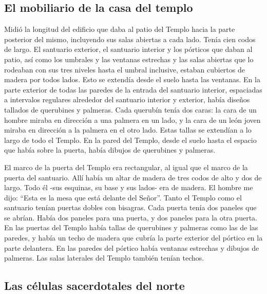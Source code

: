 \hypertarget{el-mobiliario-de-la-casa-del-templo}{%
\subsection{El mobiliario de la casa del
templo}\label{el-mobiliario-de-la-casa-del-templo}}

 Midió la longitud del edificio que daba al patio del
Templo hacia la parte posterior del mismo, incluyendo sus salas abiertas
a cada lado. Tenía cien codos de largo. El santuario exterior, el
santuario interior y los pórticos que daban al patio, 
así como los umbrales y las ventanas estrechas y las salas abiertas que
lo rodeaban con sus tres niveles hasta el umbral inclusive, estaban
cubiertos de madera por todos lados. Esto se extendía desde el suelo
hasta las ventanas.  En la parte exterior de todas las
paredes de la entrada del santuario interior, espaciadas a intervalos
regulares alrededor del santuario interior y exterior, 
había diseños tallados de querubines y palmeras. Cada querubín tenía dos
caras:  la cara de un hombre miraba en dirección a una
palmera en un lado, y la cara de un león joven miraba en dirección a la
palmera en el otro lado. Estas tallas se extendían a lo largo de todo el
Templo.  En la pared del Templo, desde el suelo hasta el
espacio que había sobre la puerta, había dibujos de querubines y
palmeras.

 El marco de la puerta del Templo era rectangular, al
igual que el marco de la puerta del santuario.  Allí
había un altar de madera de tres codos de alto y dos de largo. Todo él
-sus esquinas, su base y sus lados- era de madera. El hombre me dijo:
``Esta es la mesa que está delante del Señor''.  Tanto el
Templo como el santuario tenían puertas dobles con bisagras.
 Cada puerta tenía dos paneles que se abrían. Había dos
paneles para una puerta, y dos paneles para la otra puerta.
 En las puertas del Templo había tallas de querubines y
palmeras como las de las paredes, y había un techo de madera que cubría
la parte exterior del pórtico en la parte delantera.  En
las paredes del pórtico había ventanas estrechas y dibujos de palmeras.
Las salas laterales del Templo también tenían techos.

\hypertarget{las-cuxe9lulas-sacerdotales-del-norte}{%
\subsection{Las células sacerdotales del
norte}\label{las-cuxe9lulas-sacerdotales-del-norte}}

